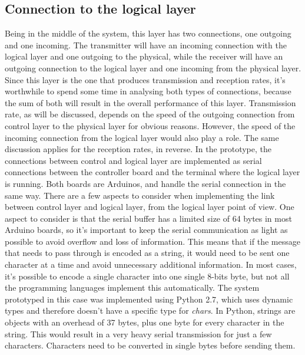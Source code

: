 \subsection{Connection to the logical layer}
Being in the middle of the system, this layer has two connections, one outgoing and one incoming.
The transmitter will have an incoming connection with the logical layer and one outgoing to the physical, while the receiver will have an outgoing connection to the logical layer and one incoming from the physical layer.
Since this layer is the one that produces transmission and reception rates, it's worthwhile to spend some time in analysing both types of connections, because the sum of both will result in the overall performance of this layer.
Transmission rate, as will be discussed, depends on the speed of the outgoing connection from control layer to the physical layer for obvious reasons.
However, the speed of the incoming connection from the logical layer would also play a role.
The same discussion applies for the reception rates, in reverse.
In the prototype, the connections between control and logical layer are implemented as serial connections between the controller board and the terminal where the logical layer is running.
Both boards are Arduinos, and handle the serial connection in the same way.
There are a few aspects to consider when implementing the link between control layer and logical layer, from the logical layer point of view.
One aspect to consider is that the serial buffer has a limited size of 64 bytes in most Arduino boards, so it's important to keep the serial communication as light as possible to avoid overflow and loss of information.
This means that if the message that needs to pass through is encoded as a string, it would need to be sent one character at a time and avoid unnecessary additional information.
In most cases, it's possible to encode a single character into one single 8-bits byte, but not all the programming languages implement this automatically.
The system prototyped in this case was implemented using Python 2.7, which uses dynamic types and therefore doesn't have a specific type for \textit{chars}. 
In Python, strings are objects with an overhead of 37 bytes, plus one byte for every character in the string.
This would result in a very heavy serial transmission for just a few characters. Characters need to be converted in single bytes before sending them. 


